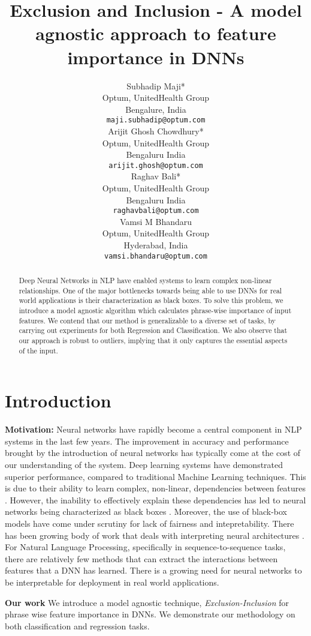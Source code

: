 \documentclass[11pt]{article}
\title{Exclusion and Inclusion - A model agnostic approach to feature importance in DNNs}
\author{
Subhadip Maji*\\
  Optum, UnitedHealth Group \\
  Bengalure, India\\
  {\tt maji.subhadip@optum.com} \\\And
  Arijit Ghosh Chowdhury* \\
  Optum, UnitedHealth Group \\
  Bengaluru India \\
  {\tt arijit.ghosh@optum.com}  \\\AND
    Raghav Bali* \\
  Optum, UnitedHealth Group \\
  Bengaluru India \\
  {\tt raghavbali@optum.com} \\\And
      Vamsi M Bhandaru \\
  Optum, UnitedHealth Group \\
  Hyderabad, India \\
  {\tt vamsi.bhandaru@optum.com} 
  \\}
\date{}
\begin{document}
\maketitle
\begin{abstract}
Deep Neural Networks in NLP have enabled systems to learn complex non-linear relationships. One of the major bottlenecks towards being able to use DNNs for real world applications is their characterization as black boxes. To solve this problem, we introduce a model agnostic algorithm which calculates phrase-wise importance of input features. We contend that our method is generalizable to a diverse set of tasks, by carrying out experiments for both Regression and Classification. We also observe that our approach is robust to outliers, implying that it only captures the essential aspects of the input.
\end{abstract}

\section{Introduction}

\textbf{Motivation:} Neural networks have rapidly become a central component in NLP systems in the last few years. The improvement in accuracy and performance brought by the introduction of neural networks has typically come at the cost of our understanding of the system. Deep learning systems have demonstrated superior performance, compared to traditional Machine Learning techniques. This is due to their ability to learn complex, non-linear, dependencies between features . However, the inability to effectively explain these dependencies has led to neural networks being characterized as black boxes . Moreover, the use of black-box models have come under scrutiny for lack of fairness and intepretability.
There has been growing body of work that deals with interpreting neural architectures \cite{ribeiro2016should,murdoch2018beyond,singh2018hierarchical}.  For Natural Language Processing, specifically in sequence-to-sequence tasks, there are relatively few methods that can extract the interactions between features that a DNN has learned.  There is a growing need for neural networks to be interpretable for deployment in real world applications.


\noindent \textbf{Our work} We introduce a model agnostic technique, \textit{Exclusion-Inclusion} for phrase wise feature importance in DNNs. We demonstrate our methodology on both classification and regression tasks.
\end{document}
